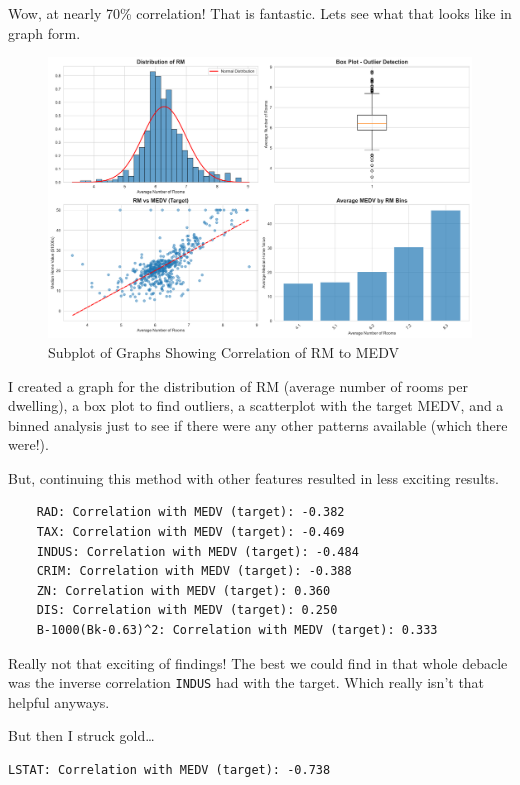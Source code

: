\documentclass[12pt]{article}
\begin{document}
Wow, at nearly 70\% correlation! That is fantastic. Lets see what that looks like in graph form. 

\begin{figure}[H]
    \centering
    \includegraphics[width=0.85\linewidth]{images/rm_analysis.png}
    \caption{Subplot of Graphs Showing Correlation of RM to MEDV}
    \label{fig:rm_analysis}
\end{figure}

I created a graph for the distribution of RM (average number of rooms per dwelling),
a box plot to find outliers, a scatterplot with the target MEDV, and a binned analysis just to see if there were any other patterns available (which there were!).

But, continuing this method with other features resulted in less exciting results.

\begin{lstlisting}
    RAD: Correlation with MEDV (target): -0.382
    TAX: Correlation with MEDV (target): -0.469
    INDUS: Correlation with MEDV (target): -0.484
    CRIM: Correlation with MEDV (target): -0.388
    ZN: Correlation with MEDV (target): 0.360
    DIS: Correlation with MEDV (target): 0.250
    B-1000(Bk-0.63)^2: Correlation with MEDV (target): 0.333
\end{lstlisting}

Really not that exciting of findings! The best we could find in that whole debacle was the inverse correlation \lstinline{INDUS} had with the target. Which really isn't that helpful anyways.

But then I struck gold\dots

\begin{lstlisting}
LSTAT: Correlation with MEDV (target): -0.738
\end{lstlisting}
\end{document}
